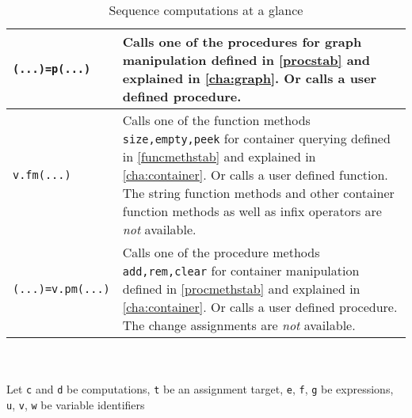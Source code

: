 \begin{table}[htbp]
\begin{minipage}{\linewidth}
\begin{tabularx}{\linewidth}{|lX|}
\hline
\texttt{(...)=p(...)}	& Calls one of the procedures for graph manipulation defined in \ref{procstab} and explained in \ref{cha:graph}. Or calls a user defined procedure.\\
\hline
\texttt{v.fm(...)}	& Calls one of the function methods \texttt{size,empty,peek} for container querying defined in \ref{funcmethstab} and explained in \ref{cha:container}. Or calls a user defined function. The string function methods and other container function methods as well as infix operators are \emph{not} available.\\
\hline
\texttt{(...)=v.pm(...)}	& Calls one of the procedure methods \texttt{add,rem,clear} for container manipulation defined in \ref{procmethstab} and explained in \ref{cha:container}. Or calls a user defined procedure. The change assignments are \emph{not} available.\\
\hline
\end{tabularx}
\end{minipage}\\
\\ 
{\small Let \texttt{c} and \texttt{d} be computations, \texttt{t} be an assignment target, \texttt{e}, \texttt{f}, \texttt{g} be expressions, \texttt{u}, \texttt{v}, \texttt{w} be variable identifiers }
\caption{Sequence computations at a glance}
\label{comptab}
\end{table}
 
